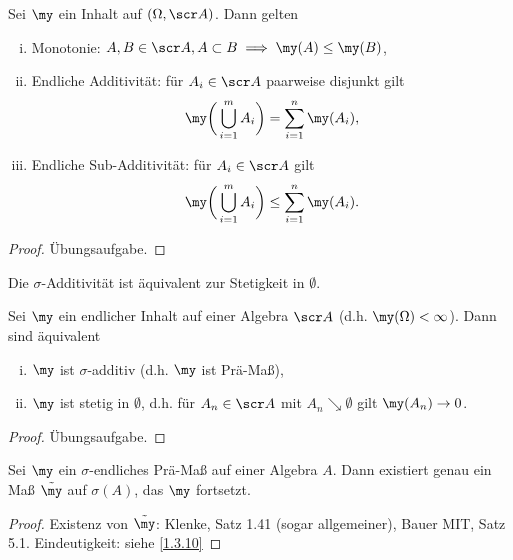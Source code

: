 \begin{nt} \label{1.3.7}
	Sei $\my$ ein Inhalt auf $(\Omega, \scr A)$.
	Dann gelten
	\begin{enumerate}[(i)]
		\item
			Monotonie: $A,B \in \scr A, A \subset B \implies \my(A) \le \my(B)$,
		\item
			Endliche Additivität: für $A_i \in \scr A$ paarweise disjunkt gilt
			\[
				\my\bigg(\bigcup_{i=1}^m A_i\bigg)
				= \sum_{i=1}^n \my(A_i),
			\]
		\item
			Endliche Sub-Additivität: für $A_i \in \scr A$ gilt
			\[
				\my\bigg(\bigcup_{i=1}^m A_i\bigg)
				\le \sum_{i=1}^n \my(A_i).
			\]
	\end{enumerate}
	\begin{proof}
		Übungsaufgabe.
	\end{proof}
\end{nt}

Die $\sigma$-Additivität ist äquivalent zur Stetigkeit in $\emptyset$.

\begin{lem} \label{1.3.8}
	Sei $\my$ ein endlicher Inhalt auf einer Algebra $\scr A$ (d.h. $\my(\Omega) < \infty$).
	Dann sind äquivalent
	\begin{enumerate}[(i)]
		\item
			$\my$ ist $\sigma$-additiv (d.h. $\my$ ist Prä-Maß),
		\item
			$\my$ ist stetig in $\emptyset$, d.h. für $A_n \in \scr A$ mit $A_n \searrow \emptyset$ gilt $\my(A_n) \to 0$.
	\end{enumerate}
	\begin{proof}
		Übungsaufgabe.
	\end{proof}
\end{lem}


\begin{st}[Caratheodory] \label{1.3.9}
	Sei $\my$ ein $\sigma$-endliches Prä-Maß auf einer Algebra $A$.
	Dann existiert genau ein Maß $\tilde \my$ auf $\sigma(A)$, das $\my$ fortsetzt.
	\begin{proof}
		Existenz von $\tilde \my$: Klenke, Satz 1.41 (sogar allgemeiner), Bauer MIT, Satz 5.1. %
		Eindeutigkeit: siehe \ref{1.3.10}
	\end{proof}
\end{st}

